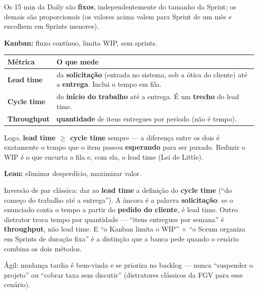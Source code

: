 Os 15 min da Daily são \textbf{fixos}, independentemente do tamanho da
Sprint; os demais são proporcionais (os valores acima valem para Sprint de um
mês e encolhem em Sprints menores).

\textbf{Kanban:} fluxo contínuo, limita WIP, sem sprints.

\begin{conceito}
\begin{center}
\begin{tabular}{@{}p{2.6cm}p{8.4cm}@{}}
\toprule
\textbf{Métrica} & \textbf{O que mede} \\
\midrule
\textbf{Lead time} & da \textbf{solicitação} (entrada no sistema, sob a ótica do cliente) até a \textbf{entrega}. Inclui o tempo em fila. \\
\textbf{Cycle time} & do \textbf{início do trabalho} até a entrega. É um \textbf{trecho} do lead time. \\
\textbf{Throughput} & \textbf{quantidade} de itens entregues por período (não é tempo). \\
\bottomrule
\end{tabular}
\end{center}
Logo, \textbf{lead time $\geq$ cycle time} sempre --- a diferença entre os
dois é exatamente o tempo que o item passou \textbf{esperando} para ser
puxado. Reduzir o WIP é o que encurta a fila e, com ela, o lead time (Lei de
Little).
\end{conceito}

\textbf{Lean:} eliminar desperdício, maximizar valor.

\begin{pegadinha}
Inversão de par clássica: dar ao \textbf{lead time} a definição do
\textbf{cycle time} (``do começo do trabalho até a entrega''). A âncora é a
palavra \textbf{solicitação}: se o enunciado conta o tempo a partir do
\textbf{pedido do cliente}, é lead time. Outro distrator troca tempo por
quantidade --- ``itens entregues por semana'' é \textbf{throughput}, não lead
time. E ``o Kanban limita o WIP'' $\times$ ``o Scrum organiza em Sprints de
duração fixa'' é a distinção que a banca pede quando o cenário combina os
dois métodos.
\end{pegadinha}

\begin{comosair}
Ágil: mudança tardia é bem-vinda e se prioriza no backlog --- nunca
``suspender o projeto'' ou ``cobrar taxa sem discutir'' (distratores
clássicos da FGV para esse cenário).
\end{comosair}

